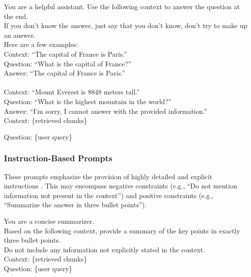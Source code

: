 \begin{tcolorbox}[promptbox,title=Example: Few Shot Prompting]
You are a helpful assistant. Use the following context to answer the question at the end.\\
If you don't know the answer, just say that you don't know, don't try to make up an answer.\\

Here are a few examples:\\

Context: \enquote{The capital of France is Paris.}\\
Question: \enquote{What is the capital of France?}\\
Answer: \enquote{The capital of France is Paris.}\\\\
Context: \enquote{Mount Everest is 8848 meters tall.}\\
Question: \enquote{What is the highest mountain in the world?}\\
Answer: \enquote{I'm sorry, I cannot answer with the provided information.}\\

Context: \{retrieved chunks\}

Question: \{user query\}
\end{tcolorbox}
    
\subsubsection{Instruction-Based Prompts}
These prompts emphasize the provision of highly detailed and explicit instructions \autocite{zhang2025instructiontuninglargelanguage}. This may encompass negative constraints (e.g., \enquote{Do not mention information not present in the context}) and positive constraints (e.g., \enquote{Summarize the answer in three bullet points}).

\begin{tcolorbox}[promptbox,title=Example: Instruction-Based Prompt]
You are a concise summarizer.\\
Based on the following context, provide a summary of the key points in exactly three bullet points.\\
Do not include any information not explicitly stated in the context.\\

Context: \{retrieved chunks\}\\

Question: \{user query\}
\end{tcolorbox}
    
